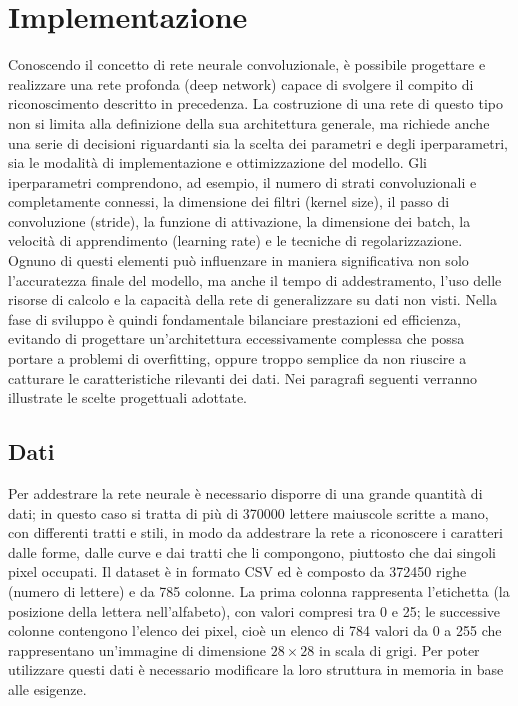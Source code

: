 \documentclass[a4paper,12pt]{article}
\begin{document}
\section{Implementazione}
Conoscendo il concetto di rete neurale convoluzionale, è possibile progettare e realizzare una rete profonda (deep network) capace di svolgere il compito di riconoscimento descritto in precedenza. La costruzione di una rete di questo tipo non si limita alla definizione della sua architettura generale, ma richiede anche una serie di decisioni riguardanti sia la scelta dei parametri e degli iperparametri, sia le modalità di implementazione e ottimizzazione del modello.
Gli iperparametri comprendono, ad esempio, il numero di strati convoluzionali e completamente connessi, la dimensione dei filtri (kernel size), il passo di convoluzione (stride), la funzione di attivazione, la dimensione dei batch, la velocità di apprendimento (learning rate) e le tecniche di regolarizzazione. Ognuno di questi elementi può influenzare in maniera significativa non solo l'accuratezza finale del modello, ma anche il tempo di addestramento, l'uso delle risorse di calcolo e la capacità della rete di generalizzare su dati non visti.
Nella fase di sviluppo è quindi fondamentale bilanciare prestazioni ed efficienza, evitando di progettare un'architettura eccessivamente complessa che possa portare a problemi di overfitting, oppure troppo semplice da non riuscire a catturare le caratteristiche rilevanti dei dati.
Nei paragrafi seguenti verranno illustrate le scelte progettuali adottate.

\subsection{Dati}
Per addestrare la rete neurale è necessario disporre di una grande quantità di dati; in questo caso si tratta di più di 370000 lettere maiuscole scritte a mano, con differenti tratti e stili, in modo da addestrare la rete a riconoscere i caratteri dalle forme, dalle curve e dai tratti che li compongono, piuttosto che dai singoli pixel occupati.
Il dataset è in formato CSV ed è composto da 372450 righe (numero di lettere) e da 785 colonne. La prima colonna rappresenta l'etichetta (la posizione della lettera nell'alfabeto), con valori compresi tra 0 e 25; le successive colonne contengono l'elenco dei pixel, cioè un elenco di 784 valori da 0 a 255 che rappresentano un'immagine di dimensione $28\times28$ in scala di grigi.
Per poter utilizzare questi dati è necessario modificare la loro struttura in memoria in base alle esigenze.
\end{document}
